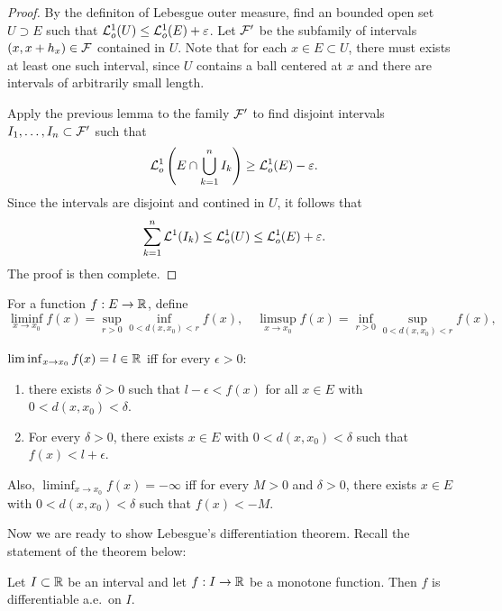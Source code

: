 \documentclass[a4paper]{article}
\begin{document}
\begin{proof}
  By the definiton of Lebesgue outer measure, find an bounded open set $U
    \supset E$ such that $\mathcal{L}_o^1 (U) \leq \mathcal{L}_o^1 (E) + \varepsilon$. Let
  $\mathcal{F}'$ be the subfamily of intervals $(x, x + h_x) \in \mathcal{F}$
  contained in $U$. Note that for each $x \in E \subset U$, there must
  exists at least one such interval, since $U$ contains a ball centered at
  $x$ and there are intervals of arbitrarily small length.

  Apply the previous lemma to the family $\mathcal{F}'$ to find disjoint
  intervals $I_1, \dots, I_n \subset \mathcal{F}'$ such that
  \[
    \mathcal{L}_o^1 \left( E \cap \bigcup_{k=1}^n I_k \right)  \geq \mathcal{L}_o^1 (E) - \varepsilon.
  \]
  Since the intervals are disjoint and contined in $U$, it follows that
  \[
    \sum_{k=1}^n \mathcal{L}^1 (I_k)  \leq \mathcal{L}_o^1 (U) \leq \mathcal{L}_o^1 (E) + \varepsilon.
  \]
  The proof is then complete.
\end{proof}

\begin{defi}
  For a function $f : E \to \mathbb{R}$, define
  \[
    \liminf_{x \to x_0} f(x) = \sup_{r > 0} \inf_{0 < d(x, x_0) < r} f(x),
    \quad
    \limsup_{x \to x_0} f(x) = \inf_{r > 0} \sup_{0 < d(x, x_0) < r} f(x),
  \]
\end{defi}

\begin{ex}
  $\liminf_{x \to x_0} f(x) = l \in \mathbb{R}$ iff for every
  $\epsilon > 0$:
  \begin{enumerate}
    \item there exists $\delta > 0$ such that $l - \epsilon < f(x)$ for
          all $x \in E$ with $0 < d(x, x_0) < \delta$.
    \item For every $\delta > 0$, there exists $x \in E$ with $0 < d(x,
          x_0) < \delta$ such that $f(x) < l + \epsilon$.
  \end{enumerate}

  Also, $\liminf_{x \to x_0} f(x) = -\infty$ iff for every $M > 0$ and
  $\delta > 0$, there exists $x \in E$ with $0 < d(x, x_0) < \delta$ such
  that $f(x) < - M$.
\end{ex}

Now we are ready to show Lebesgue's differentiation theorem. Recall the
statement of the theorem below:

\begin{thm}
  Let $I \subset \mathbb{R}$ be an interval and let $f : I \to \mathbb{R}$ be a monotone
  function. Then $f$ is differentiable a.e.\ on $I$.
\end{thm}
\end{document}
